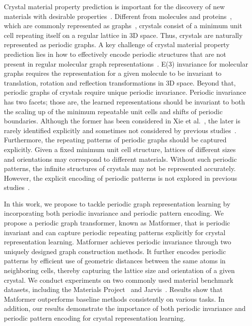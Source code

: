 \documentclass{article}
\begin{document}
Crystal material property prediction is important for the discovery of new materials with desirable properties~\citep{crystal1,crystal2,crystal3,crystal4,crystal5,cgcnn,schnet,megnet,gatgnn,alignn}.
Different from molecules and proteins~\citep{gori2005new, wu2018moleculenet,shervashidze2011weisfeiler,fout2017protein,wang2022advanced,liu2021dig,stokes2020deep}, which are commonly represented as graphs~\citep{gat_velivckovic2018graph,liu2020deep,gao2019graph,gao2021topology,liu2020towards,liu2021graphebm,luo2021graphdf}, crystals consist of a minimum unit cell repeating itself on a regular lattice in 3D space. Thus, crystals are naturally represented as periodic graphs.
A key challenge of crystal material property prediction lies in how to effectively encode periodic structures that are not present in regular molecular graph representations~\citep{3dtransformer,keriven2019universal,schnet,Dimenet,klicpera2020fast,liu2021spherical,klicpera2021gemnet,satorras2021n,jaini2021learning,e3nngeiger2022,nequip}. 
E(3) invariance for molecular graphs requires the representation for a given molecule to be invariant to translation, rotation and reflection transformations in 3D space.
Beyond that,
periodic graphs of crystals require unique 
periodic invariance. 
Periodic invariance has two facets; those are, the learned representations should be invariant to both the scaling up of the minimum repeatable unit cells
and shifts of periodic boundaries. Although the former has been considered in
Xie et al.~\citep{cgcnn, cdvae}, the later is rarely identified explicitly and sometimes not considered by previous studies~\citep{cgcnn,megnet,crabnet,schnet,alignn,cdvae,gatgnn,graphormer, nequip, chen2021direct}. 
Furthermore, the repeating patterns of periodic graphs should be captured explicitly. 
Given a fixed minimum unit cell structure, 
lattices of different sizes and orientations may correspond to different materials. Without such periodic patterns, the infinite structures of crystals may not be represented accurately. However, 
the explicit encoding of periodic patterns is not explored in previous studies~\citep{cgcnn,megnet,schnet,alignn,gatgnn,nequip}. 

In this work, we propose to tackle periodic graph representation learning by incorporating both periodic invariance and periodic pattern encoding. We propose a periodic graph transformer, known as Matformer, that is periodic invariant and can capture periodic repeating patterns explicitly for crystal representation learning. Matformer achieves periodic invariance through two uniquely designed graph construction methods. It further encodes periodic patterns by efficient use of geometric distances between the same atoms in neighboring cells, thereby capturing the lattice size and orientation of a given crystal.
We conduct experiments on two commonly used material benchmark datasets, including the Materials Project~\citep{jain2013commentary} and Jarvis~\citep{choudhary2020joint}. Results show that Matformer outperforms baseline methods consistently on various tasks. In addition, our results demonstrate the importance of both periodic invariance and periodic pattern encoding for crystal representation learning.
\end{document}
